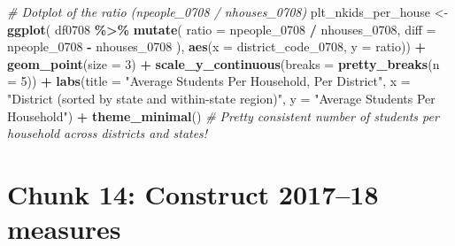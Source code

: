 \documentclass[
]{article}
\newenvironment{Shaded}{\begin{snugshade}}{\end{snugshade}}
\newcommand{\AttributeTok}[1]{\textcolor[rgb]{0.13,0.29,0.53}{#1}}
\newcommand{\CommentTok}[1]{\textcolor[rgb]{0.56,0.35,0.01}{\textit{#1}}}
\newcommand{\DecValTok}[1]{\textcolor[rgb]{0.00,0.00,0.81}{#1}}
\newcommand{\FunctionTok}[1]{\textcolor[rgb]{0.13,0.29,0.53}{\textbf{#1}}}
\newcommand{\NormalTok}[1]{#1}
\newcommand{\OtherTok}[1]{\textcolor[rgb]{0.56,0.35,0.01}{#1}}
\newcommand{\SpecialCharTok}[1]{\textcolor[rgb]{0.81,0.36,0.00}{\textbf{#1}}}
\newcommand{\StringTok}[1]{\textcolor[rgb]{0.31,0.60,0.02}{#1}}
\begin{document}
\begin{Shaded}
\begin{Highlighting}[]
\CommentTok{\# Dotplot of the ratio (npeople\_0708 / nhouses\_0708)}
\NormalTok{plt\_nkids\_per\_house }\OtherTok{\textless{}{-}} \FunctionTok{ggplot}\NormalTok{(}
\NormalTok{  df0708 }\SpecialCharTok{\%\textgreater{}\%} \FunctionTok{mutate}\NormalTok{(}
    \AttributeTok{ratio =}\NormalTok{ npeople\_0708 }\SpecialCharTok{/}\NormalTok{ nhouses\_0708,}
         \AttributeTok{diff  =}\NormalTok{ npeople\_0708 }\SpecialCharTok{{-}}\NormalTok{ nhouses\_0708}
\NormalTok{    ),}
  \FunctionTok{aes}\NormalTok{(}\AttributeTok{x =}\NormalTok{ district\_code\_0708, }\AttributeTok{y =}\NormalTok{ ratio)) }\SpecialCharTok{+}
  \FunctionTok{geom\_point}\NormalTok{(}\AttributeTok{size =} \DecValTok{3}\NormalTok{) }\SpecialCharTok{+}
  \FunctionTok{scale\_y\_continuous}\NormalTok{(}\AttributeTok{breaks =} \FunctionTok{pretty\_breaks}\NormalTok{(}\AttributeTok{n =} \DecValTok{5}\NormalTok{)) }\SpecialCharTok{+}
  \FunctionTok{labs}\NormalTok{(}\AttributeTok{title =} \StringTok{"Average Students Per Household, Per District"}\NormalTok{,}
       \AttributeTok{x =} \StringTok{"District (sorted by state and within{-}state region)"}\NormalTok{, }\AttributeTok{y =} \StringTok{"Average Students Per Household"}\NormalTok{) }\SpecialCharTok{+}
  \FunctionTok{theme\_minimal}\NormalTok{()}
\CommentTok{\# Pretty consistent number of students per household across districts and states!}
\end{Highlighting}
\end{Shaded}

\section*{Chunk 14: Construct 2017--18 measures}\label{chunk-14-construct-201718-measures}
\end{document}
